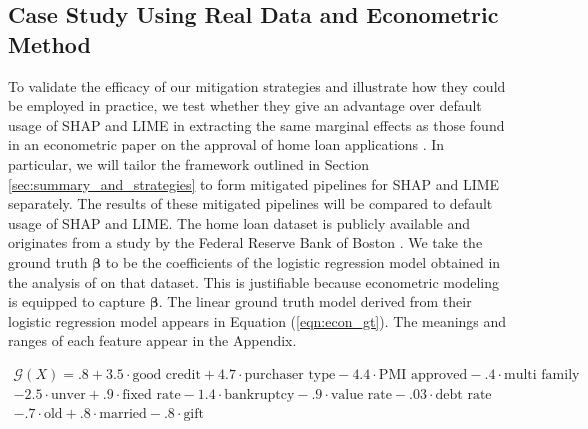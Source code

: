 \documentclass[12pt]{article}  %
\begin{document}
\subsection{Case Study Using Real Data and Econometric Method}
    \label{sec:case_study}
    To validate the efficacy of our mitigation strategies and illustrate how they could be employed in practice, we test whether they give an advantage over default usage of SHAP and LIME in extracting the same marginal effects as those found in an econometric paper on the approval of home loan applications \citep{bane2006econometric}. In particular, we will tailor the framework outlined in Section \ref{sec:summary_and_strategies} to form mitigated pipelines for SHAP and LIME separately. The results of these mitigated pipelines will be compared to default usage of SHAP and LIME. The home loan dataset is publicly available and originates from a study by the Federal Reserve Bank of Boston \citep{hunter1996cultural}. We take the ground truth $\boldsymbol{\beta}$ to be the coefficients of the logistic regression model obtained in the analysis of \cite{bane2006econometric} on that dataset. This is justifiable because econometric modeling is equipped to capture $\boldsymbol{\beta}$. The linear ground truth model derived from their logistic regression model appears in Equation (\ref{eqn:econ_gt}). The meanings and ranges of each feature appear in the Appendix.  %

    \begin{equation}
    \label{eqn:econ_gt}
    \begin{split}
        \mathcal{G}(X) =.8 + 3.5\cdot \text{good credit} + 4.7\cdot \text{purchaser type} -4.4 \cdot \text{PMI approved} - .4 \cdot \text{multi family} \\ -2.5 \cdot \text{unver} + .9 \cdot \text{fixed rate} - 1.4 \cdot \text{bankruptcy} - .9 \cdot \text{value rate} - .03 \cdot \text{debt rate} \\- .7 \cdot \text{old} + .8 \cdot \text{married} - .8 \cdot \text{gift}
    \end{split}
    \end{equation}
    
\end{document}
